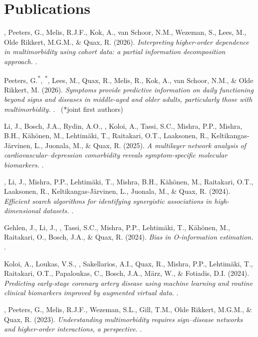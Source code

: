\documentclass[10pt]{article}
\begin{document}
\section{Publications}
\begin{pubs}
  \item {}, Peeters, G., Melis, R.J.F., Kok, A., van Schoor, N.M., Wezeman, S., Lees, M., Olde Rikkert, M.G.M., \& Quax, R. (2026). \emph{Interpreting higher-order dependence in multimorbidity using cohort data: a partial information decomposition approach.} . 
  \item Peeters, G.\textsuperscript{*}, \textsuperscript{*}, Lees, M., Quax, R., Melis, R., Kok, A., van Schoor, N.M., \& Olde Rikkert, M. (2026). \emph{Symptoms provide predictive information on daily functioning beyond signs and diseases in middle-aged and older adults, particularly those with multimorbidity.} . \ {\small\color{cvmuted}(*joint first authors)}
  \item Li, J., Bosch, J.A., Rydin, A.O., , Koloi, A., Tassi, S.C., Mishra, P.P., Mishra, B.H., K\"ah\"onen, M., Lehtim\"aki, T., Raitakari, O.T., Laaksonen, R., Keltikangas-J\"arvinen, L., Juonala, M., \& Quax, R. (2025). \emph{A multilayer network analysis of cardiovascular--depression comorbidity reveals symptom-specific molecular biomarkers.} . 
  \item {}, Li, J., Mishra, P.P., Lehtim\"aki, T., Mishra, B.H., K\"ah\"onen, M., Raitakari, O.T., Laaksonen, R., Keltikangas-J\"arvinen, L., Juonala, M., \& Quax, R. (2024). \emph{Efficient search algorithms for identifying synergistic associations in high-dimensional datasets.} . 
  \item Gehlen, J., Li, J., , Tassi, S.C., Mishra, P.P., Lehtim\"aki, T., K\"ah\"onen, M., Raitakari, O., Bosch, J.A., \& Quax, R. (2024). \emph{Bias in O-information estimation.} . 
  \item Koloi, A., Loukas, V.S., , Sakellarios, A.I., Quax, R., Mishra, P.P., Lehtim\"aki, T., Raitakari, O.T., Papaloukas, C., Bosch, J.A., M\"arz, W., \& Fotiadis, D.I. (2024). \emph{Predicting early-stage coronary artery disease using machine learning and routine clinical biomarkers improved by augmented virtual data.} . 
  \item {}, Peeters, G., Melis, R.J.F., Wezeman, S.L., Gill, T.M., Olde Rikkert, M.G.M., \& Quax, R. (2023). \emph{Understanding multimorbidity requires sign--disease networks and higher-order interactions, a perspective.} . 
\end{pubs}
\end{document}
